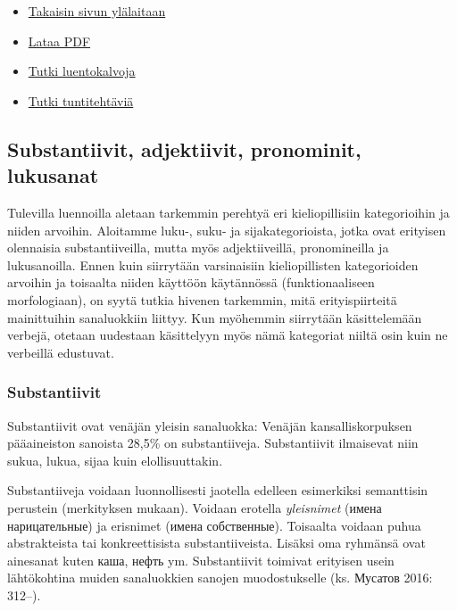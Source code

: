 \documentclass[]{scrartcl}
\providecommand{\tightlist}{%
  \setlength{\itemsep}{0pt}\setlength{\parskip}{0pt}}
\begin{document}
\begin{itemize}
\tightlist
\item
  \href{https://mustikka.uta.fi/~juho_harme/morfologia/\#tästä-kurssista}{Takaisin
  sivun ylälaitaan}
\item
  \href{http://mustikka.uta.fi/~juho_harme/morfologia/materiaalit/luento2.pdf}{Lataa
  PDF}
\item
  \href{http://mustikka.uta.fi/~juho_harme/morfologia/presentations/luento2.html}{Tutki
  luentokalvoja}
\item
  \href{http://mustikka.uta.fi/~juho_harme/morfologia/tehtavat/luento2.pdf}{Tutki
  tuntitehtäviä}
\end{itemize}

\subsection{Substantiivit, adjektiivit, pronominit,
lukusanat}\label{substantiivit-adjektiivit-pronominit-lukusanat}

Tulevilla luennoilla aletaan tarkemmin perehtyä eri kieliopillisiin
kategorioihin ja niiden arvoihin. Aloitamme luku-, suku- ja
sijakategorioista, jotka ovat erityisen olennaisia substantiiveilla,
mutta myös adjektiiveillä, pronomineilla ja lukusanoilla. Ennen kuin
siirrytään varsinaisiin kieliopillisten kategorioiden arvoihin ja
toisaalta niiden käyttöön käytännössä (funktionaaliseen morfologiaan),
on syytä tutkia hivenen tarkemmin, mitä erityispiirteitä mainittuihin
sanaluokkiin liittyy. Kun myöhemmin siirrytään käsittelemään verbejä,
otetaan uudestaan käsittelyyn myös nämä kategoriat niiltä osin kuin ne
verbeillä edustuvat.

\subsubsection{Substantiivit}\label{substantiivit}

Substantiivit ovat venäjän yleisin sanaluokka: Venäjän
kansalliskorpuksen pääaineiston sanoista 28,5\% on substantiiveja.
Substantiivit ilmaisevat niin sukua, lukua, sijaa kuin elollisuuttakin.

Substantiiveja voidaan luonnollisesti jaotella edelleen esimerkiksi
semanttisin perustein (merkityksen mukaan). Voidaan erotella
\emph{yleisnimet} (имена нарицательные) ja erisnimet (имена
собственные). Toisaalta voidaan puhua abstrakteista tai konkreettisista
substantiiveista. Lisäksi oma ryhmänsä ovat ainesanat kuten каша, нефть
ym. Substantiivit toimivat erityisen usein lähtökohtina muiden
sanaluokkien sanojen muodostukselle (ks. Мусатов 2016: 312--).
\end{document}
